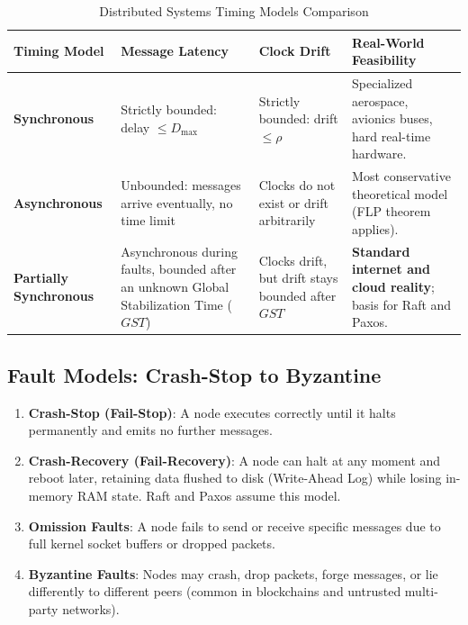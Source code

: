 \begin{table}[htbp]
\centering\small
\begin{tabular}{lp{4.2cm}p{4.2cm}p{3.8cm}}
\toprule
\textbf{Timing Model} & \textbf{Message Latency} & \textbf{Clock Drift} & \textbf{Real-World Feasibility} \\
\midrule
\textbf{Synchronous} & Strictly bounded: delay $\le D_{\text{max}}$ & Strictly bounded: drift $\le \rho$ & Specialized aerospace, avionics buses, hard real-time hardware. \\
\textbf{Asynchronous} & Unbounded: messages arrive eventually, no time limit & Clocks do not exist or drift arbitrarily & Most conservative theoretical model (FLP theorem applies). \\
\textbf{Partially Synchronous} & Asynchronous during faults, bounded after an unknown Global Stabilization Time ($GST$) & Clocks drift, but drift stays bounded after $GST$ & \textbf{Standard internet and cloud reality}; basis for Raft and Paxos. \\
\bottomrule
\end{tabular}
\caption{Distributed Systems Timing Models Comparison}
\label{tab:v4-ch01-timing-models}
\end{table}

\subsection{Fault Models: Crash-Stop to Byzantine}

\begin{enumerate}[leftmargin=18pt]
  \item \textbf{Crash-Stop (Fail-Stop)}: A node executes correctly until it halts permanently and emits no further messages.
  \item \textbf{Crash-Recovery (Fail-Recovery)}: A node can halt at any moment and reboot later, retaining data flushed to disk (Write-Ahead Log) while losing in-memory RAM state. Raft and Paxos assume this model.
  \item \textbf{Omission Faults}: A node fails to send or receive specific messages due to full kernel socket buffers or dropped packets.
  \item \textbf{Byzantine Faults}: Nodes may crash, drop packets, forge messages, or lie differently to different peers (common in blockchains and untrusted multi-party networks).
\end{enumerate}

